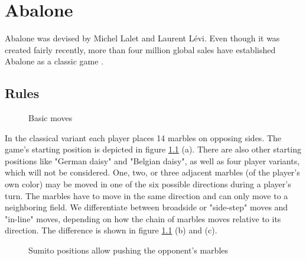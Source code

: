 \chapter{Abalone}
Abalone was devised by Michel Lalet and Laurent Lévi. Even though it was created fairly recently, more than four million global sales have established Abalone as a classic game \cite{noauthor_abalone_2020}.

\section{Rules}

\begin{figure}[!h]
    \centering
    \hfill
    \hfill
    \caption{Basic moves \cite{abalone_sa_abalone_nodate}}
    \label{basics}
\end{figure}

In the classical variant each player places 14 marbles on opposing sides. The game's starting position is depicted in figure \ref{basics} (a). There are also other starting positions like "German daisy" and "Belgian daisy", as well as four player variants, which will not be considered. One, two, or three adjacent marbles (of the player's own color) may be moved in one of the six possible directions during a player's turn. The marbles have to move in the same direction and can only move to a neighboring field. We differentiate between broadside or "side-step" moves and "in-line" moves, depending on how the chain of marbles moves relative to its direction. The difference is shown in figure \ref{basics} (b) and (c).

\begin{figure}[!h]
    \centering
    \hfill
    \hfill
    \caption{Sumito positions allow pushing the opponent's marbles \cite{abalone_sa_abalone_nodate}}
    \label{sumito}
\end{figure}

